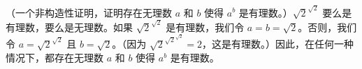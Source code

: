 \begin{enumerate}
\begin{enumerate}
    （一个非构造性证明，证明存在无理数 $a$ 和 $b$ 使得 $a^b$ 是有理数。）$\sqrt{2}^{\sqrt{2}}$ 要么是有理数，要么是无理数。如果 $\sqrt{2}^{\sqrt{2}}$ 是有理数，我们令 $a=b=\sqrt{2}$。否则，我们令 $a=\sqrt{2}^{\sqrt{2}}$ 且 $b=\sqrt{2}$。（因为 $\sqrt{2}^{\sqrt{2}^{\sqrt{2}}} = 2$，这是有理数。）因此，在任何一种情况下，都存在无理数 $a$ 和 $b$ 使得 $a^b$ 是有理数。
    \wbvfill
    
    \end{enumerate}
    
    
    
    \end{enumerate}